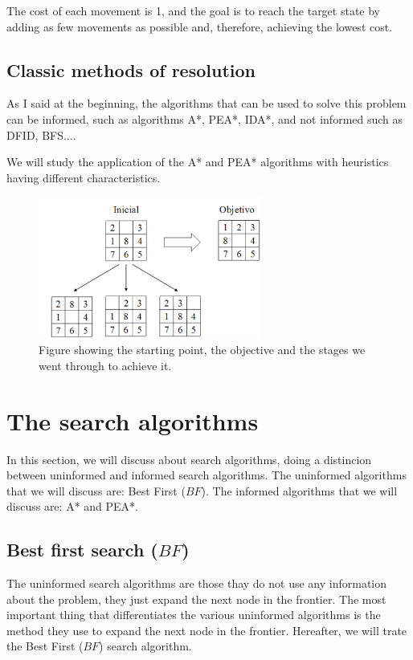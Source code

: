 \documentclass[runningheads]{llncs}
\begin{document}
The cost of each movement is 1, and the goal is to reach the target state by adding as few movements as possible 
and, therefore, achieving the lowest cost.

\subsection{Classic methods of resolution}
As I said at the beginning, the algorithms that can be used to solve this problem can be informed, such as algorithms 
A*, PEA*, IDA*, and not informed such as DFID, BFS....

We will study the application of the A* and PEA* algorithms with heuristics having different characteristics.

\begin{figure}
\centering
\includegraphics[width=0.65\textwidth]{8puzzle.png}
\caption{Figure showing the starting point, the objective and the stages we went through to achieve it.} \label{fig1}
\end{figure}

\section{The search algorithms}
In this section, we will discuss about search algorithms, doing a distincion between uninformed and informed search algorithms.
The uninformed algorithms that we will discuss are: Best First (\(BF\)).
The informed algorithms that we will discuss are: A* and PEA*.

\subsection{Best first search (\(BF\))}
The uninformed search algorithms are those thay do not use any information about the problem, they just expand the next node in the frontier.
The most important thing that differentiates the various uninformed algorithms is the method they use to expand the next node in the frontier.
Hereafter, we will trate the Best First (\(BF\)) search algorithm.
\end{document}
